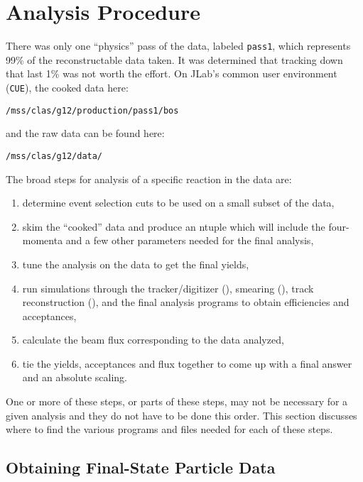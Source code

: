 \section{Analysis Procedure}

There was only one ``physics'' pass of the  data, labeled \texttt{pass1}, which represents 99\% of the reconstructable data taken. It was determined that tracking down that last 1\% was not worth the effort. On JLab's common user environment (\texttt{CUE}), the cooked data here:
\begin{center}
    \texttt{/mss/clas/g12/production/pass1/bos}
\end{center}
and the raw data can be found here:
\begin{center}
    \texttt{/mss/clas/g12/data/}
\end{center}

The broad steps for analysis of a specific reaction in the  data are:
\begin{enumerate}
    \item determine event selection cuts to be used on a small subset of the data,
    \item skim the ``cooked'' data and produce an ntuple which will include the four-momenta and a few other parameters needed for the final analysis,
    \item tune the analysis on the data to get the final yields,
    \item run simulations through the tracker/digitizer (), smearing (), track reconstruction (), and the final analysis programs to obtain efficiencies and acceptances,
    \item calculate the beam flux corresponding to the data analyzed,
    \item tie the yields, acceptances and flux together to come up with a final answer and an absolute scaling.
\end{enumerate}
One or more of these steps, or parts of these steps, may not be necessary for a given analysis and they do not have to be done this order. This section discusses where to find the various programs and files needed for each of these steps.

\subsection{\label{sec:ana.data}Obtaining Final-State Particle Data}


